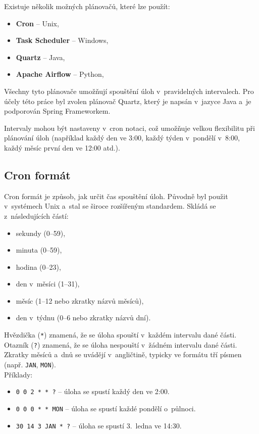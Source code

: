 Existuje několik možných plánovačů, které lze použít:
\begin{itemize}[itemsep=-2pt]
    \item \textbf{Cron} -- Unix,
    \item \textbf{Task Scheduler} -- Windows,
    \item \textbf{Quartz} -- Java,
    \item \textbf{Apache Airflow} -- Python,
\end{itemize}

Všechny tyto plánovače umožňují spouštění úloh v~pravidelných intervalech.
Pro účely této práce byl zvolen plánovač Quartz, který je napsán v~jazyce Java
a~je podporován Spring Frameworkem.

Intervaly mohou být nastaveny v~cron notaci, což umožňuje velkou flexibilitu při plánování úloh
(například každý den ve 3:00, každý týden v~pondělí v~8:00, každý měsíc první den ve 12:00 atd.).

\subsection{Cron formát}
\label{sec:cron_format}
Cron formát je způsob, jak určit čas spouštění úloh.
Původně byl použit v~systémech Unix a~stal se široce rozšířeným standardem.
Skládá se z~následujících částí:
\begin{itemize}[itemsep=-2pt]
    \item sekundy (0--59),
    \item minuta (0--59),
    \item hodina (0--23),
    \item den v~měsíci (1--31),
    \item měsíc (1--12 nebo zkratky názvů měsíců),
    \item den v~týdnu (0--6 nebo zkratky názvů dní).
\end{itemize}
Hvězdička (\texttt{*}) znamená, že se úloha spouští v~každém intervalu dané části.
Otazník (\texttt{?}) znamená, že se úloha nespouští v~žádném intervalu dané části.
Zkratky měsíců a~dnů se uvádějí v~angličtině, typicky ve formátu tří písmen (např. \texttt{JAN}, \texttt{MON}).
\\ Příklady:
\begin{itemize}
    \item \texttt{0 0 2 * * ?} -- úloha se spustí každý den ve 2:00.
    \item \texttt{0 0 0 * * MON} -- úloha se spustí každé pondělí o~půlnoci.
    \item \texttt{30 14 3 JAN * ?} -- úloha se spustí 3.~ledna ve 14:30.
\end{itemize}

